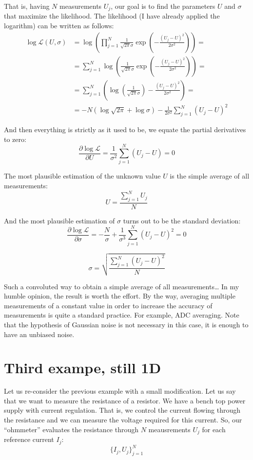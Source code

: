 \documentclass[notitlepage,oneside]{book}
\begin{document}
That is, having $N$ measurements $U_j$, our goal is to find the parameters $U$ and $\sigma$ that maximize the likelihood.
The likelihood (I have already applied the logarithm) can be written as follows:
\begin{align*}
\log \mathcal{L}(U,\sigma) & = \log \left(\prod\limits_{j=1}^N  \frac{1}{\sqrt{2\pi}\sigma} \exp\left(-\frac{(U_j-U)^2}{2\sigma^2}\right)\right) =\\
& = \sum\limits_{j=1}^N \log \left(\frac{1}{\sqrt{2\pi}\sigma} \exp\left(-\frac{(U_j-U)^2}{2\sigma^2}\right)\right) = \\
& = \sum\limits_{j=1}^N \left(\log \left(\frac{1}{\sqrt{2\pi}\sigma}\right) -\frac{(U_j-U)^2}{2\sigma^2}\right) = \\
& = -N \left(\log\sqrt{2\pi} + \log\sigma\right) - \frac{1}{2\sigma^2} \sum\limits_{j=1}^N (U_j-U)^2
\end{align*}

And then everything is strictly as it used to be, we equate the partial derivatives to zero:
$$
\frac{\partial\log\mathcal{L}}{\partial U}    =  \frac{1}{\sigma^2}\sum\limits_{j=1}^N (U_j-U) = 0 
$$

The most plausible estimation of the unknown value $U$ is the simple average of all measurements:
$$
U = \frac{\sum\limits_{j=1}^N U_j}{N}
$$

And the most plausible estimation of $\sigma$ turns out to be the standard deviation:
$$
\frac{\partial\log\mathcal{L}}{\partial\sigma} =  -\frac{N}{\sigma} + \frac{1}{\sigma^3}\sum\limits_{j=1}^N (U_j-U)^2 = 0
$$

$$
\sigma = \sqrt{\frac{\sum\limits_{j=1}^N (U_j-U)^2}{N}} 
$$

Such a convoluted way to obtain a simple average of all measurements\dots
In my humble opinion, the result is worth the effort.
By the way, averaging multiple measurements of a constant value in order to increase the accuracy of measurements is quite a standard practice.
For example, ADC averaging. Note that the hypothesis of Gaussian noise is not necessary in this case, it is enough to have an unbiased noise.


\section{Third exampe, still 1D}

Let us re-consider the previous example with a small modification.
Let us say that we want to measure the resistance of a resistor.
We have a bench top power supply with current regulation.
That is, we control the current flowing through the resistance and we can measure the voltage required for this current.
So, our ``ohmmeter'' evaluates the resistance through $N$ meausrements $U_j$ for each reference current $I_j$:
$$
\{I_j, U_j\}_{j=1}^{N}
$$
\end{document}
